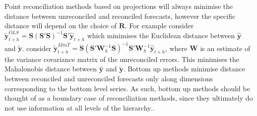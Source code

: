 \documentclass[a4paper, 11pt]{article}
\theoremstyle{theo}
\theoremstyle{definition}
\begin{document}
Point reconciliation methods based on projections will always minimise the distance between unreconciled and reconciled forecasts, however the specific distance will depend on the choice of ${\bm R}$.  For example \cite{Hyndman2011} consider $\tilde{\bm{y}}^{OLS}_{t+h}=\bm{S}(\bm{S}' \bm{S})^{-1}\bm{S}' \hat{\bm{y}}_{t+h}$ which minimises the Euclidean distance between $\hat{\bm y}$ and $\tilde{\bm y}$. \cite{Wickramasuriya2017} consider $\tilde{\bm{y}}^{MinT}_{t+h}=\bm{S}(\bm{S}' \bm{W}^{-1}_{h}\bm{S})^{-1}\bm{S}'\bm{W}^{-1}_{h} \hat{\bm{y}}_{t+h}$, where ${\bm W}$ is an estimate of the variance covariance matrix of the unreconciled errors.  This 
minimises the Mahalonobis distance between $\hat{\bm y}$ and $\tilde{\bm y}$.  Bottom up methods minimise distance between reconciled and unreconciled forecasts only along dimensions corresponding to the bottom level series.  As such, bottom up methods should be thought of as a boundary case of reconciliation methods, since they ultimately do not use information at all levels of the hierarchy..


%
\end{document}
